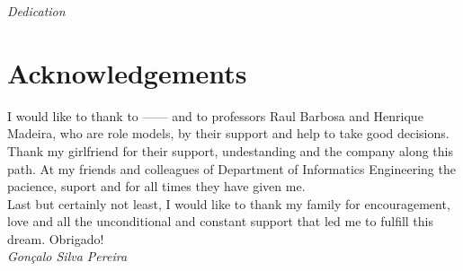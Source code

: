 

\begin{center}

\emph{Dedication}
	
\end{center}



\newpage

\section*{Acknowledgements}

I would like to thank to ------ and to professors Raul Barbosa and Henrique Madeira, who are role models, by their support and help to take good decisions.\\

Thank my girlfriend for their support, undestanding and the company along this path. At my friends and colleagues of Department of Informatics Engineering the pacience, suport and for all times they have given me. \\

Last but certainly not least, I would like to thank my family for encouragement, love and all the unconditional and constant support that led me to fulfill this dream. Obrigado!\\



\emph{\hfill Gonçalo Silva Pereira}